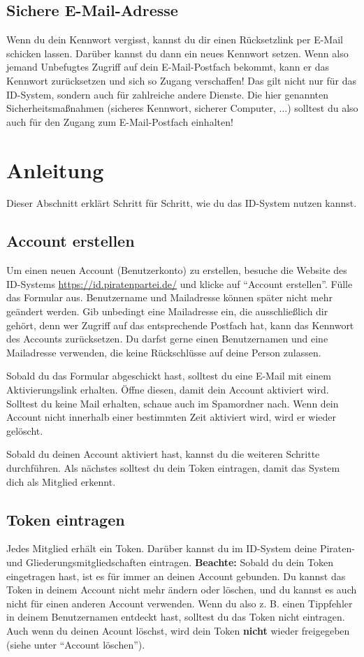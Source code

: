 \subsection{Sichere E-Mail-Adresse}
Wenn du dein Kennwort vergisst, kannst du dir einen Rücksetzlink per E-Mail schicken lassen.
Darüber kannst du dann ein neues Kennwort setzen.
Wenn also jemand Unbefugtes Zugriff auf dein E-Mail-Postfach bekommt,
kann er das Kennwort zurücksetzen und sich so Zugang verschaffen!
Das gilt nicht nur für das ID-System, sondern auch für zahlreiche andere Dienste.
Die hier genannten Sicherheitsmaßnahmen (sicheres Kennwort, sicherer Computer, ...) solltest du also auch für den Zugang zum E-Mail-Postfach einhalten!

\newpage
\section{Anleitung}
Dieser Abschnitt erklärt Schritt für Schritt, wie du das ID-System nutzen kannst.

\subsection{Account erstellen}
Um einen neuen Account (Benutzerkonto) zu erstellen, besuche die Website des ID-Systems \url{https://id.piratenpartei.de/} und klicke auf "`Account erstellen"'.
Fülle das Formular aus.
Benutzername und Mailadresse können später nicht mehr geändert werden.
Gib unbedingt eine Mailadresse ein, die ausschließlich dir gehört, denn wer Zugriff auf das entsprechende Postfach hat, kann das Kennwort des Accounts zurücksetzen.
Du darfst gerne einen Benutzernamen und eine Mailadresse verwenden, die keine Rück\-schlüs\-se auf deine Person zulassen.

Sobald du das Formular abgeschickt hast, solltest du eine E-Mail mit einem Aktivierungslink erhalten.
Öffne diesen, damit dein Account aktiviert wird.
Solltest du keine Mail erhalten, schaue auch im Spamordner nach.
Wenn dein Account nicht innerhalb einer bestimmten Zeit aktiviert wird, wird er wieder gelöscht.

Sobald du deinen Account aktiviert hast, kannst du die weiteren Schritte durchführen.
Als nächstes solltest du dein Token eintragen, damit das System dich als Mitglied erkennt.

\subsection{Token eintragen}
Jedes Mitglied erhält ein Token. Darüber kannst du im ID-System deine Piraten- und Gliederungsmitgliedschaften eintragen.
\textbf{Beachte:} Sobald du dein Token eingetragen hast, ist es für immer an deinen Account gebunden.
Du kannst das Token in deinem Account nicht mehr ändern oder löschen, und du kannst es auch nicht für einen anderen Account verwenden.
Wenn du also z. B. einen Tippfehler in deinem Benutzernamen entdeckt hast, solltest du das Token nicht eintragen.
Auch wenn du deinen Acount löschst, wird dein Token \textbf{nicht} wieder freigegeben (siehe unter "`Account löschen"').

